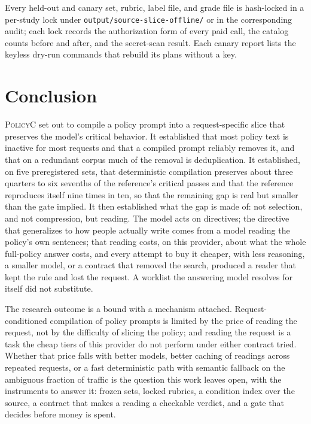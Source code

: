 \documentclass[11pt]{article}
\newcommand{\policyc}{\textsc{PolicyC}\xspace}
\begin{document}
Every held-out and canary set, rubric, label file, and grade file is hash-locked in a per-study lock under \texttt{output/source-slice-offline/} or in the corresponding audit; each lock records the authorization form of every paid call, the catalog counts before and after, and the secret-scan result. Each canary report lists the keyless dry-run commands that rebuild its plans without a key.

\section{Conclusion}

\policyc set out to compile a policy prompt into a request-specific slice that preserves the model's critical behavior. It established that most policy text is inactive for most requests and that a compiled prompt reliably removes it, and that on a redundant corpus much of the removal is deduplication. It established, on five preregistered sets, that deterministic compilation preserves about three quarters to six sevenths of the reference's critical passes and that the reference reproduces itself nine times in ten, so that the remaining gap is real but smaller than the gate implied. It then established what the gap is made of: not selection, and not compression, but reading. The model acts on directives; the directive that generalizes to how people actually write comes from a model reading the policy's own sentences; that reading costs, on this provider, about what the whole full-policy answer costs, and every attempt to buy it cheaper, with less reasoning, a smaller model, or a contract that removed the search, produced a reader that kept the rule and lost the request. A worklist the answering model resolves for itself did not substitute.

The research outcome is a bound with a mechanism attached. Request-conditioned compilation of policy prompts is limited by the price of reading the request, not by the difficulty of slicing the policy; and reading the request is a task the cheap tiers of this provider do not perform under either contract tried. Whether that price falls with better models, better caching of readings across repeated requests, or a fast deterministic path with semantic fallback on the ambiguous fraction of traffic is the question this work leaves open, with the instruments to answer it: frozen sets, locked rubrics, a condition index over the source, a contract that makes a reading a checkable verdict, and a gate that decides before money is spent.
\end{document}
